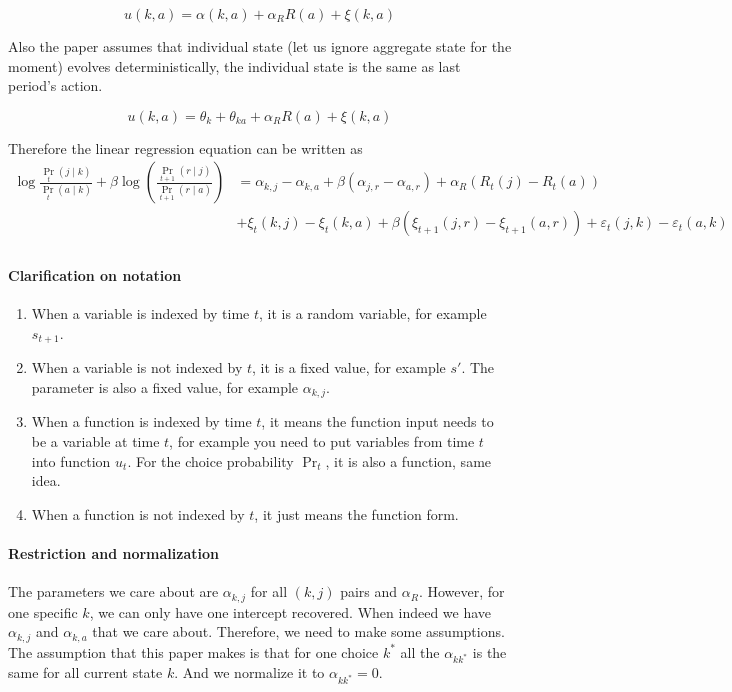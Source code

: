 \documentclass[12pt]{article}[margin=1in]
\begin{document}
$$  u(k, a) = \alpha(k,a) + \alpha_R R(a) + \xi(k,a)$$

Also the paper assumes that individual state (let us ignore aggregate state for the moment) evolves deterministically, the individual state is the same as last period's action.

$$ u(k, a) = \theta_k + \theta_{ka} + \alpha_R R(a) + \xi(k,a)$$

Therefore the linear regression equation can be written as
\begin{equation} \label{eq:linear_regression}
    \begin{split}
        \log \frac{\Pr_t(j \mid k)}{\Pr_t(a \mid k)} + \beta\log(\frac{\Pr_{t+1}(r \mid j)}{\Pr_{t+1}(r \mid a)})
         & =  \alpha_{k,j}-\alpha_{k,a}+\beta(\alpha_{j,r}-\alpha_{a,r}) + \alpha_R (R_t(j) - R_t(a)) \\ & + \xi_t(k,j)-\xi_t(k,a) + \beta(\xi_{t+1}(j, r) - \xi_{t+1}(a, r)) + \varepsilon_t(j,k) - \varepsilon_t(a,k)\\
    \end{split}
\end{equation}


\paragraph{Clarification on notation}
\begin{enumerate}
    \item When a variable is indexed by time $t$, it is a random variable, for example $s_{t+1}$.
    \item When a variable is not indexed by $t$, it is a fixed value, for example $s'$. The parameter is also a fixed value, for example $\alpha_{k,j}$. \item When a function is indexed by time $t$, it means the function input needs to be a variable at time $t$, for example you need to put variables from time $t$ into function $u_t$. For the choice probability $\Pr_t$, it is also a function, same idea.
    \item When a function is not indexed by $t$, it just means the function form.
\end{enumerate}

\paragraph{Restriction and normalization}

The parameters we care about are $\alpha_{k,j}$ for all $(k,j)$ pairs and $\alpha_R$. However, for one specific $k$, we can only have one intercept recovered. When indeed we have $\alpha_{k,j}$ and $\alpha_{k,a}$ that we care about. Therefore, we need to make some assumptions. The assumption that this paper makes is that for one choice $k^*$ all the $\alpha_{kk^*}$ is the same for all current state $k$. And we normalize it to $\alpha_{kk^*} = 0$.
\end{document}
